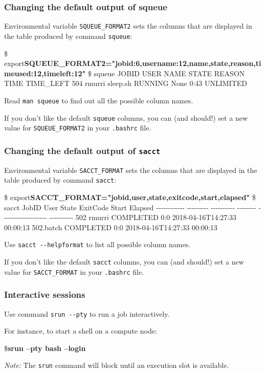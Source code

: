 \documentclass[english,serif,mathserif,usenames,dvipsnames]{beamer}
\begin{document}
\begin{frame}[fragile]
  \frametitle{Changing the default output of squeue}

  Environmental variable \texttt{SQUEUE\_FORMAT2} sets the columns that
  are displayed in the table produced by command \texttt{squeue}:

  \begin{semiverbatim}\tiny
\$ export{\bfseries SQUEUE_FORMAT2="jobid:6,username:12,name,state,reason,timeused:12,timeleft:12"}
\$ squeue
JOBID USER        NAME                STATE       REASON              TIME        TIME_LEFT
504   rmurri      sleep.sh            RUNNING     None                0:43        UNLIMITED
\end{semiverbatim}

  \+
  Read \texttt{man squeue} to find out all the possible column names.

  \+ If you don't like the default \texttt{squeue} columns, you can
  (and should!) set a new value for \texttt{SQUEUE\_FORMAT2} in your
  \texttt{.bashrc} file.
\end{frame}


\begin{frame}[fragile]
  \frametitle{Changing the default output of \texttt{sacct}}

  Environmental variable \texttt{SACCT\_FORMAT} sets the columns that
  are displayed in the table produced by command \texttt{sacct}:

  \begin{semiverbatim}\tiny
\$ export{\bfseries SACCT_FORMAT="jobid,user,state,exitcode,start,elapsed"}
\$ sacct
       JobID      User      State ExitCode               Start    Elapsed
-{}-{}-{}-{}-{}-{}-{}-{}-{}-{}-{}- -{}-{}-{}-{}-{}-{}-{}-{}- -{}-{}-{}-{}-{}-{}-{}-{}-{}- -{}-{}-{}-{}-{}-{}-{}- -{}-{}-{}-{}-{}-{}-{}-{}-{}-{}-{}-{}-{}-{}-{}-{}-{}-{}- -{}-{}-{}-{}-{}-{}-{}-{}-{}-
502             rmurri  COMPLETED      0:0 2018-04-16T14:27:33   00:00:13
502.batch               COMPLETED      0:0 2018-04-16T14:27:33   00:00:13
\end{semiverbatim}

  \+
  Use \texttt{sacct -{}-helpformat} to list all possible column names.

  \+ If you don't like the default \texttt{sacct} columns, you can
  (and should!) set a new value for \texttt{SACCT\_FORMAT} in your
  \texttt{.bashrc} file.
\end{frame}


\begin{frame}[fragile]
  \frametitle{Interactive sessions}

  Use command \texttt{srun -{}-pty} to run a job interactively.

  \+
  For instance, to start a shell on a compute node:
\begin{semiverbatim}
\${\bfseries srun --pty bash --login}
\end{semiverbatim}

  \+ \emph{Note:} The \texttt{srun} command will block until an
  execution slot is available.
\end{frame}
\end{document}
